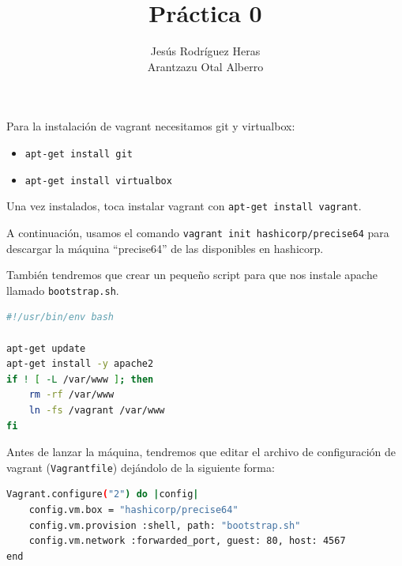 \documentclass[12pt,letterpaper]{article}
\title{Práctica 0}
\author{Jesús Rodríguez Heras\\
	Arantzazu Otal Alberro}
\begin{document}
	
	\maketitle
%			
	\thispagestyle{empty}
	\newpage
	
	
	
	
	
	\lstset{language=bash, numbers=left, numberstyle=\tiny, numbersep=10pt, firstnumber=1, stepnumber=1, basicstyle=\small\ttfamily, tabsize=1, extendedchars=true, inputencoding=latin1}
	
Para la instalación de vagrant necesitamos git y virtualbox:
\begin{itemize}
	\item \texttt{apt-get install git}
	\item \texttt{apt-get install virtualbox}
\end{itemize}
Una vez instalados, toca instalar vagrant con \texttt{apt-get install vagrant}.

A continuación, usamos el comando \texttt{vagrant init hashicorp/precise64} para descargar la máquina ``precise64'' de las disponibles en hashicorp.

También tendremos que crear un pequeño script para que nos instale apache llamado \texttt{bootstrap.sh}.
\begin{lstlisting}[language=Bash]
#!/usr/bin/env bash

apt-get update
apt-get install -y apache2
if ! [ -L /var/www ]; then
    rm -rf /var/www
    ln -fs /vagrant /var/www
fi
\end{lstlisting}

Antes de lanzar la máquina, tendremos que editar el archivo de configuración de vagrant (\texttt{Vagrantfile}) dejándolo de la siguiente forma:
\begin{lstlisting}[language=Bash]
Vagrant.configure("2") do |config|
    config.vm.box = "hashicorp/precise64"
    config.vm.provision :shell, path: "bootstrap.sh"
    config.vm.network :forwarded_port, guest: 80, host: 4567
end
\end{lstlisting}
\end{document}

